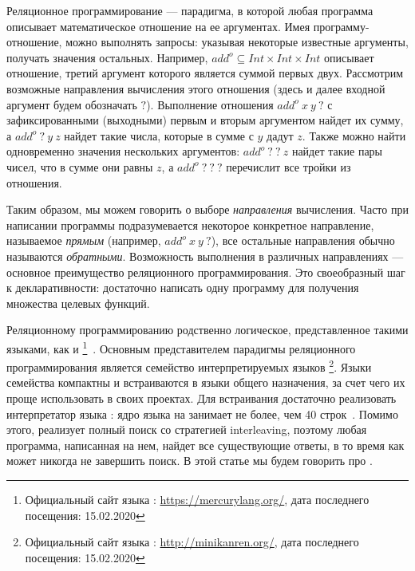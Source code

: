 \documentclass[conference,american,russian]{IEEEtran}
\begin{document}
Реляционное программирование --- парадигма, в которой любая программа описывает математическое отношение на ее аргументах. 
Имея программу-отношение, можно выполнять запросы: указывая некоторые известные аргументы, получать значения остальных.
Например, $add^o \subseteq Int \times Int \times Int$ описывает отношение, третий аргумент которого является суммой первых двух. 
Рассмотрим возможные направления вычисления этого отношения (здесь и далее входной аргумент будем обозначать $?$).
Выполнение отношения $add^o  \ x \ y \ ?$ с зафиксированными (выходными) первым и вторым аргументом найдет их сумму, а $add^o \ ? \ y \ z$ найдет такие числа, которые в сумме с $y$ дадут $z$. 
Также можно найти одновременно значения нескольких аргументов: $add^o \ ? \ ? \ z$ найдет такие пары чисел, что в сумме они равны $z$, а $add^o \ ? \ ? \ ?$ перечислит все тройки из отношения. 

Таким образом, мы можем говорить о выборе \textit{направления} вычисления. 
Часто при написании программы подразумевается некоторое конкретное направление, называемое \textit{прямым} (например, $add^o  \ x \ y \ ?$), все остальные направления обычно называются \textit{обратными}. 
Возможность выполнения в различных направлениях --- основное преимущество реляционного программирования. 
Это своеобразный шаг к декларативности: достаточно написать одну программу для получения множества целевых функций. 

Реляционному программированию родственно логическое, представленное такими языками, как \prolog{} и \mercury{}\footnote{Официальный сайт языка \mercury{}: \url{https://mercurylang.org/}, дата последнего посещения: 15.02.2020}~\cite{SOMOGYI199617}.
Основным представителем парадигмы реляционного программирования является семейство интерпретируемых языков \miniKanren{}\footnote{Официальный сайт языка \miniKanren{}: \url{http://minikanren.org/}, дата последнего посещения: 15.02.2020}.
Языки семейства \miniKanren{} компактны и встраиваются в языки общего назначения, за счет чего их проще использовать в своих проектах. 
Для встраивания достаточно реализовать интерпретатор языка \miniKanren{}: ядро языка на \scheme{} занимает не более, чем 40 строк~\cite{hemann2013ukanren}.
Помимо этого, \miniKanren{} реализует полный поиск со стратегией interleaving, поэтому любая программа, написанная на нем, найдет все существующие ответы, в то время как \prolog{} может никогда не завершить поиск. 
В этой статье мы будем говорить про \miniKanren{}.
\end{document}
